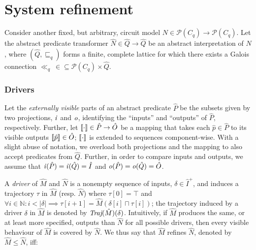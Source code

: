 \section{System refinement}

Consider another fixed, but arbitrary, circuit model $N \in \mathcal{P}(C_{q}) \rightarrow \mathcal{P}(C_{q})$. Let the abstract predicate transformer $\hat N \in \hat Q \rightarrow \hat Q$ be an abstract interpretation of $N$, where $(\hat Q, \sqsubseteq_{q})$ forms a finite, complete lattice for which there exists a Galois connection $\ll_{q} \: \in \left. \subseteq \mathcal{P}(C_{q}) \times \hat Q \right.$.





\subsubsection{Drivers} Let the \textit{externally visible} parts of an abstract predicate $\hat P$ be the subsets given by two projections, $\mathit{i}$ and $\mathit{o}$, identifying the ``inputs'' and ``outputs'' of $\hat P$, respectively. Further, let $\llbracket\cdot\rrbracket \in \hat P \rightarrow \hat O$ be a mapping that takes each $\hat p \in \hat P$ to its visible outputs $\llbracket\hat p\rrbracket \in \hat O$; $\llbracket\cdot\rrbracket$ is extended to sequences component-wise. With a slight abuse of notation, we overload both projections and the mapping to also accept predicates from $\hat Q$. Further, in order to compare inputs and outputs, we assume that $\mathit{i}(\hat P) = \mathit{i}(\hat Q) = \hat I$ and $\mathit{o}(\hat P) = \mathit{o}(\hat Q) = \hat O$.

A \textit{driver} of $\hat M$ and $\hat N$ is a nonempty sequence of inputs, $\delta \in \hat I^{+}$, and induces a trajectory $\tau$ in $\hat M$ (resp. $\hat N$) where $\tau[0] = \top$ and $\forall i \in \mathbb{N} : i < | \delta | \implies \tau[i+1] = \hat M(\delta[i] \sqcap \tau[i])$; the trajectory induced by a driver $\delta$ in $\hat M$ is denoted by $\textit{Traj}(\hat M)(\delta)$. Intuitively, if $\hat M$ produces the same, or at least more specified, outputs than $\hat N$ for all possible drivers, then every visible behaviour of $\hat M$ is covered by $\hat N$. We thus say that $\hat M$ refines $\hat N$, denoted by $\hat M \leq \hat N$, iff:

